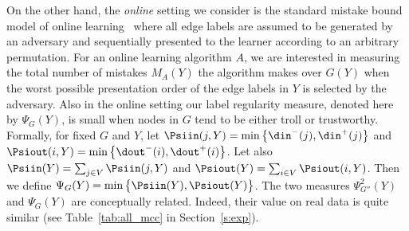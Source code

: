 On the other hand, the {\em online} setting we consider is the standard mistake bound model of online learning~\cite{Winnow88} where all edge labels are assumed to be generated by an adversary and sequentially presented to the learner according to an arbitrary permutation. For an online learning algorithm $A$, we are interested in measuring the total number of mistakes $M_A(Y)$ the algorithm makes over $G(Y)$ when the worst possible presentation order of the edge labels in $Y$ is selected by the adversary.
Also in the online setting our label regularity measure, denoted here by $\Psi_G(Y)$, is small when nodes in $G$ tend to be either troll or trustworthy. 
Formally, for fixed $G$ and $Y$, let 
$
    \Psiin(j,Y) = \min\big\{\din^-(j),\din^+(j)\big\}
$ and
$
    \Psiout(i,Y) = \min\big\{\dout^-(i),\dout^+(i)\big\}
$.
Let also
$
    \Psiin(Y) = \sum_{j \in V} \Psiin(j,Y)
$ and
$
\Psiout(Y) = \sum_{i \in V} \Psiout(i,Y)
$.
Then we define $\Psi_G(Y) = \min\big\{\Psiin(Y),\Psiout(Y)\big\}$. The two measures $\Psi^2_{G''}(Y)$ and $\Psi_G(Y)$ are conceptually related. %
Indeed, their value on real data is quite similar%
(see Table~\ref{tab:all_mcc} in Section~\ref{s:exp}).



